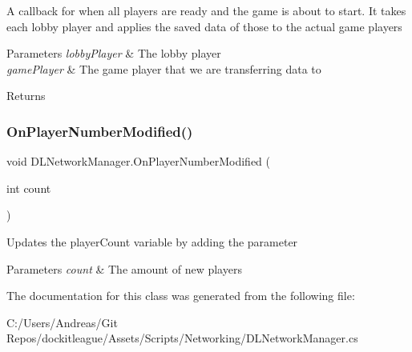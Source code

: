 A callback for when all players are ready and the game is about to start. It takes each lobby player and applies the saved data of those to the actual game players 


\begin{DoxyParams}{Parameters}
{\em lobby\+Player} & The lobby player\\
\hline
{\em game\+Player} & The game player that we are transferring data to\\
\hline
\end{DoxyParams}
\begin{DoxyReturn}{Returns}

\end{DoxyReturn}
\hypertarget{class_d_l_network_manager_afc0830b22829b7f7ace8e11528f4753b}{}\label{class_d_l_network_manager_afc0830b22829b7f7ace8e11528f4753b} 
\subsubsection{\texorpdfstring{On\+Player\+Number\+Modified()}{OnPlayerNumberModified()}}
{\footnotesize\ttfamily void D\+L\+Network\+Manager.\+On\+Player\+Number\+Modified (\begin{DoxyParamCaption}\item[{int}]{count }\end{DoxyParamCaption})}



Updates the player\+Count variable by adding the parameter 


\begin{DoxyParams}{Parameters}
{\em count} & The amount of new players\\
\hline
\end{DoxyParams}


The documentation for this class was generated from the following file\+:\begin{DoxyCompactItemize}
\item 
C\+:/\+Users/\+Andreas/\+Git Repos/dockitleague/\+Assets/\+Scripts/\+Networking/D\+L\+Network\+Manager.\+cs\end{DoxyCompactItemize}
